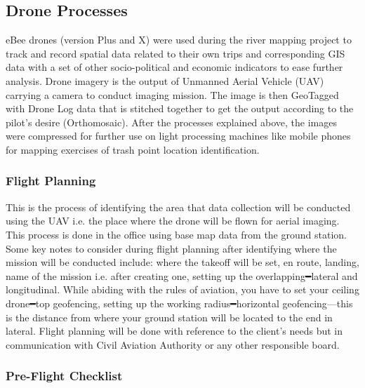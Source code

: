 \documentclass[a4paper,12pt,twoside]{article}
\begin{document}
\subsection{Drone Processes}

    \begin{multicols}{2}
        eBee drones (version Plus and X) were used during the river mapping project to track and record spatial data related to their own trips and corresponding GIS data with a set of other socio-political and economic indicators to ease further analysis. Drone imagery is the output of Unmanned Aerial Vehicle (UAV) carrying a camera to conduct imaging mission. The image is then GeoTagged with Drone Log data that is stitched together to get the output according to the pilot’s desire (Orthomosaic). After the processes explained above, the images were compressed for further use on light processing machines like mobile phones for mapping exercises of trash point location identification.
    \end{multicols}
    
    \subsubsection{Flight Planning}
        This is the process of identifying the area that data collection will be conducted using the UAV i.e. the place where the drone will be flown for aerial imaging. This process is done in the office using base map data from the ground station. Some key notes to consider during flight planning after identifying where the mission will be conducted include: where the takeoff will be set, en route, landing, name of the mission i.e. after creating one, setting up the overlapping━lateral and longitudinal. While abiding with the rules of aviation, you have to set your ceiling drone━top geofencing, setting up the working radius━horizontal geofencing---this is the distance from where your ground station will be located to the end in lateral. Flight planning will be done with reference to the client’s needs but in communication with Civil Aviation Authority or any other responsible board.
    
    \subsubsection{Pre-Flight Checklist}
    
\end{document}
